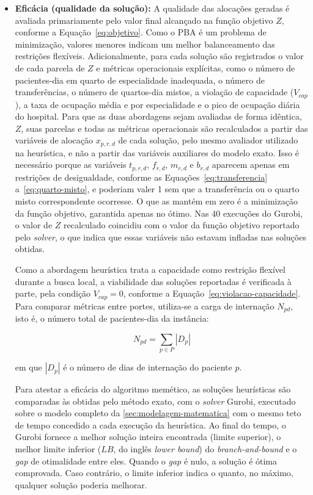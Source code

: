 \begin{itemize}
    \item \textbf{Eficácia (qualidade da solução):} A qualidade das alocações geradas é avaliada primariamente pelo valor final alcançado na função objetivo $Z$, conforme a Equação~\eqref{eq:objetivo}. Como o PBA é um problema de minimização, valores menores indicam um melhor balanceamento das restrições flexíveis. Adicionalmente, para cada solução são registrados o valor de cada parcela de $Z$ e métricas operacionais explícitas, como o número de pacientes-dia em quarto de especialidade inadequada, o número de transferências, o número de quartos-dia mistos, a violação de capacidade ($V_{cap}$), a taxa de ocupação média e por especialidade e o pico de ocupação diária do hospital. Para que as duas abordagens sejam avaliadas de forma idêntica, $Z$, suas parcelas e todas as métricas operacionais são recalculados a partir das variáveis de alocação $x_{p,r,d}$ de cada solução, pelo mesmo avaliador utilizado na heurística, e não a partir das variáveis auxiliares do modelo exato. Isso é necessário porque as variáveis $t_{p,r,d}$, $f_{r,d}$, $m_{r,d}$ e $b_{r,d}$ aparecem apenas em restrições de desigualdade, conforme as Equações~\eqref{eq:transferencia} a~\eqref{eq:quarto-misto}, e poderiam valer 1 sem que a transferência ou o quarto misto correspondente ocorresse. O que as mantém em zero é a minimização da função objetivo, garantida apenas no ótimo. Nas 40 execuções do Gurobi, o valor de $Z$ recalculado coincidiu com o valor da função objetivo reportado pelo \textit{solver}, o que indica que essas variáveis não estavam infladas nas soluções obtidas.

    Como a abordagem heurística trata a capacidade como restrição flexível durante a busca local, a viabilidade das soluções reportadas é verificada à parte, pela condição $V_{cap} = 0$, conforme a Equação~\eqref{eq:violacao-capacidade}. Para comparar métricas entre portes, utiliza-se a carga de internação $N_{pd}$, isto é, o número total de pacientes-dia da instância:

    \begin{equation}
        N_{pd} = \sum_{p \in P} |D_p|
        \label{eq:carga-internacao}
    \end{equation}
    
    em que $|D_p|$ é o número de dias de internação do paciente $p$.

    Para atestar a eficácia do algoritmo memético, as soluções heurísticas são comparadas às obtidas pelo método exato, com o \textit{solver} Gurobi, executado sobre o modelo completo da \autoref{sec:modelagem-matematica} com o mesmo teto de tempo concedido a cada execução da heurística. Ao final do tempo, o Gurobi fornece a melhor solução inteira encontrada (limite superior), o melhor limite inferior ($LB$, do inglês \textit{lower bound}) do \textit{branch-and-bound} e o \textit{gap} de otimalidade entre eles. Quando o \textit{gap} é nulo, a solução é ótima comprovada. Caso contrário, o limite inferior indica o quanto, no máximo, qualquer solução poderia melhorar.


\end{itemize}
